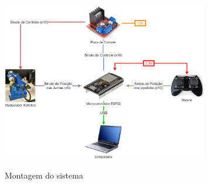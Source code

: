 \begin{figure}[H]
    \centering
    \caption{Montagem do sistema}
    \includegraphics[keepaspectratio=true, width=0.8\textwidth]
    	{img/projeto-sistema.png}
    \label{fig:montagemSistema}
\end{figure}


